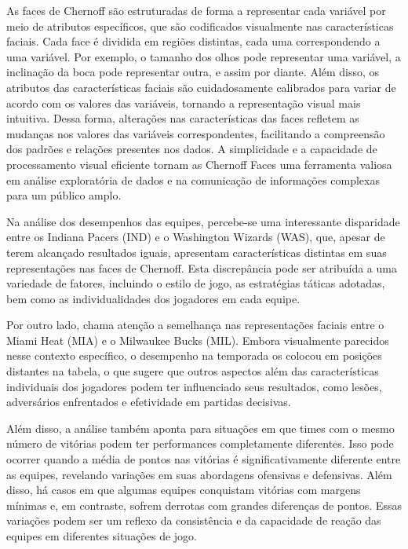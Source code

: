 \documentclass[
]{book}
\begin{document}
As faces de Chernoff são estruturadas de forma a representar cada variável por meio de atributos específicos, que são codificados visualmente nas características faciais. Cada face é dividida em regiões distintas, cada uma correspondendo a uma variável. Por exemplo, o tamanho dos olhos pode representar uma variável, a inclinação da boca pode representar outra, e assim por diante. Além disso, os atributos das características faciais são cuidadosamente calibrados para variar de acordo com os valores das variáveis, tornando a representação visual mais intuitiva. Dessa forma, alterações nas características das faces refletem as mudanças nos valores das variáveis correspondentes, facilitando a compreensão dos padrões e relações presentes nos dados. A simplicidade e a capacidade de processamento visual eficiente tornam as Chernoff Faces uma ferramenta valiosa em análise exploratória de dados e na comunicação de informações complexas para um público amplo.

Na análise dos desempenhos das equipes, percebe-se uma interessante disparidade entre os Indiana Pacers (IND) e o Washington Wizards (WAS), que, apesar de terem alcançado resultados iguais, apresentam características distintas em suas representações nas faces de Chernoff. Esta discrepância pode ser atribuída a uma variedade de fatores, incluindo o estilo de jogo, as estratégias táticas adotadas, bem como as individualidades dos jogadores em cada equipe.

Por outro lado, chama atenção a semelhança nas representações faciais entre o Miami Heat (MIA) e o Milwaukee Bucks (MIL). Embora visualmente parecidos nesse contexto específico, o desempenho na temporada os colocou em posições distantes na tabela, o que sugere que outros aspectos além das características individuais dos jogadores podem ter influenciado seus resultados, como lesões, adversários enfrentados e efetividade em partidas decisivas.

Além disso, a análise também aponta para situações em que times com o mesmo número de vitórias podem ter performances completamente diferentes. Isso pode ocorrer quando a média de pontos nas vitórias é significativamente diferente entre as equipes, revelando variações em suas abordagens ofensivas e defensivas. Além disso, há casos em que algumas equipes conquistam vitórias com margens mínimas e, em contraste, sofrem derrotas com grandes diferenças de pontos. Essas variações podem ser um reflexo da consistência e da capacidade de reação das equipes em diferentes situações de jogo.
\end{document}
